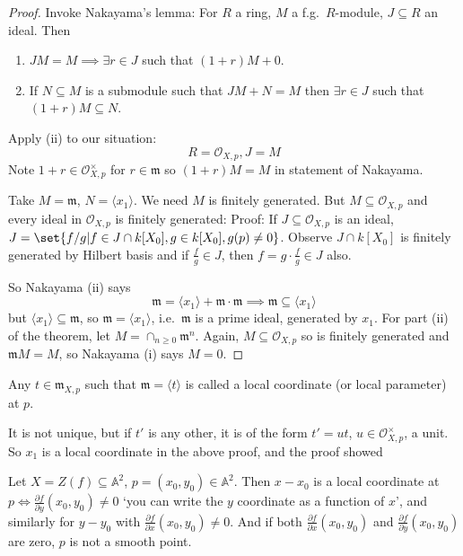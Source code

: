 \documentclass{article}
\newcommand{\A}{\mathbb{A}}
\begin{document}
\begin{proof}
    Invoke Nakayama's lemma: For $R$ a ring, $M$ a f.g.\ $R$-module, $J \subseteq R$ an ideal. Then
    \begin{enumerate}[label=(\roman*)]
        \item $JM=M \implies \exists r \in J$ such that $(1+r) M + 0$.
        \item If $N \subseteq M$ is a submodule such that $JM + N = M$ then $\exists r \in J$ such that $(1+r) M \subseteq N$.
    \end{enumerate}

    Apply (ii) to our situation:
    \begin{equation*}
        R = \mathcal{O}_{X, p}, J = M
    \end{equation*}
    Note $1+r \in \mathcal{O}_{X, p}^{\times}$ for $r \in \mathfrak{m}$ so $(1+r) M = M$ in statement of Nakayama.

    Take $M = \mathfrak{m}$, $N =\langle x_1 \rangle$. We need $M$ is finitely generated.
    But $M \subseteq \mathcal{O}_{X, p}$ and every ideal in $\mathcal{O}_{X, p}$ is finitely generated:
    Proof: If $J \subseteq \mathcal{O}_{X, p}$ is an ideal, $J = \set{f/g | f \in J \cap k[X_0], g \in k[X_0], g(p) \neq 0}$. Observe $J \cap k[X_0]$ is finitely generated by Hilbert basis and if $\frac{f}{g} \in J$, then $f = g \cdot \frac{f}{g} \in J$ also.

    So Nakayama (ii) says
    \begin{equation*}
        \mathfrak{m} = \langle x_1 \rangle + \mathfrak{m}\cdot \mathfrak{m} \implies \mathfrak{m} \subseteq \langle x_1 \rangle
    \end{equation*}
    but $\langle x_1 \rangle \subseteq \mathfrak{m}$, so $\mathfrak{m} = \langle x_1 \rangle$, i.e.\ $\mathfrak{m}$ is a prime ideal, generated by $x_1$.
    For part (ii) of the theorem, let $M = \cap_{n \geq 0} \mathfrak{m}^n$. Again, $M \subseteq \mathcal{O}_{X, p}$ so is finitely generated and $\mathfrak{m} M = M$, so Nakayama (i) says $M=0$.
\end{proof}

\begin{defi}
    Any $t \in \mathfrak{m}_{X, p}$ such that $\mathfrak{m} = \langle t \rangle$ is called a local coordinate (or local parameter) at $p$.
\end{defi}
It is not unique, but if $t'$ is any other, it is of the form $t' = ut$, $u \in \mathcal{O}_{X, p}^\times$, a unit.
So $x_1$ is a local coordinate in the above proof, and the proof showed
\begin{cor}
    Let $X = Z(f) \subseteq \A^2$, $p = (x_0, y_0) \in \A^2$.
    Then $x - x_0$ is a local coordinate at $p \iff \frac{\partial f}{\partial y}(x_0, y_0) \neq 0$ `you can write the $y$ coordinate as a function of $x$', and similarly for $y - y_0$ with $\frac{\partial f}{\partial x}(x_0, y_0) \neq 0$.
    And if both $\frac{\partial f}{\partial x}(x_0, y_0)$ and $\frac{\partial f}{\partial y}(x_0, y_0)$ are zero, $p$ is not a smooth point.
\end{cor}
\end{document}
